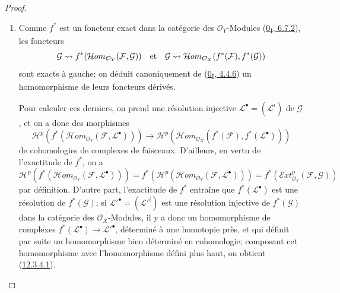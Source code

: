 \begin{proof}
\begin{enumerate}
\item[{\rm(i)}]
Comme $f^*$ est un foncteur exact dans la catégorie des
$\mathcal O_Y$-Modules (\hyperref[0.6.7.2-fr]{0\textsubscript{I}, 6.7.2}),
les foncteurs
\[
\mathcal G\leadsto
f^*(\mathcal{H}om_{\mathcal O_Y}(\mathcal F,\mathcal G))
\quad\hbox{et}\quad
\mathcal G\leadsto
\mathcal{H}om_{\mathcal O_X}(f^*(\mathcal F),f^*(\mathcal G))
\]
sont exacts à gauche; on déduit canoniquement de
(\hyperref[0.4.4.6-fr]{0\textsubscript{I}, 4.4.6}) un homomorphisme de leurs
foncteurs dérivés.

Pour calculer ces derniers, on prend une résolution injective
$\mathcal L^\bullet=(\mathcal L^i)$ de $\mathcal G$, et on a donc des
morphismes
\[
\mathcal H^p(f^*(\mathcal{H}om_{\mathcal O_Y}
(\mathcal F,\mathcal L^\bullet)))
\longrightarrow
\mathcal H^p(\mathcal{H}om_{\mathcal O_X}
(f^*(\mathcal F),f^*(\mathcal L^\bullet)))
\]
de cohomologies de complexes de faisceaux. D'ailleurs, en vertu de
l'exactitude de $f^*$, on a
\[
\mathcal H^p(f^*(\mathcal{H}om_{\mathcal O_Y}
(\mathcal F,\mathcal L^\bullet)))
=f^*(\mathcal H^p(\mathcal{H}om_{\mathcal O_Y}
(\mathcal F,\mathcal L^\bullet)))
=f^*(\mathcal{E}xt_{\mathcal O_Y}^p(\mathcal F,\mathcal G))
\]
par définition. D'autre part, l'exactitude de $f^*$ entraîne que
$f^*(\mathcal L^\bullet)$ est une résolution de $f^*(\mathcal G)$; si
$\mathcal L'^\bullet=(\mathcal L'^{i})$ est une résolution injective de
$f^*(\mathcal G)$ dans la catégorie des $\mathcal O_X$-Modules, il y a donc
un homomorphisme de complexes
$f^*(\mathcal L^\bullet)\to\mathcal L'^\bullet$, déterminé à une homotopie
près, et qui définit par suite un homomorphisme bien déterminé en cohomologie;
composant cet homomorphisme avec l'homomorphisme défini plus haut, on obtient
(\hyperref[0.12.3.4.1-fr]{12.3.4.1}).


\end{enumerate}
\end{proof}
